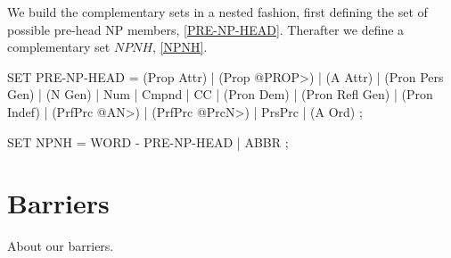 \documentclass[a4paper,english]{article}
\begin{document}
We build the complementary sets in a nested fashion, first defining the set of possible pre-head NP members, \ref{PRE-NP-HEAD}. Therafter we define a complementary set $NPNH$, \ref{NPNH}.


\begin{example}\label{PRE-NP-HEAD}
SET PRE-NP-HEAD = (Prop Attr) | (Prop @PROP>) | (A Attr) | (Pron Pers Gen) | (N Gen) | Num | Cmpnd | CC | (Pron Dem) | (Pron Refl Gen) | (Pron Indef) | (PrfPrc @AN>) | (PrfPrc @PrcN>) | PrsPrc | (A Ord) ; \\
\end{example}
\begin{example}\label{NPNH}
SET NPNH = WORD - PRE-NP-HEAD | ABBR ; \\                 
\end{example}

\section{Barriers}

About our barriers.





\end{document}
